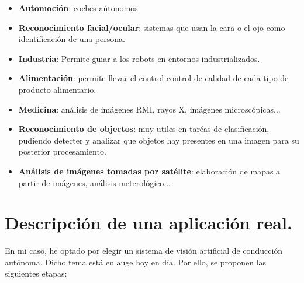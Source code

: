 \documentclass[12pt]{article}
\begin{document}
\begin{itemize}
	\item \textbf{Automoción}: coches aútonomos.
	\item \textbf{Reconocimiento facial/ocular}: sistemas que usan la cara o el ojo como identificación de una persona.
	\item \textbf{Industria}: Permite guiar a los robots en entornos industrializados.
	\item \textbf{Alimentación}: permite llevar el control control de calidad de cada tipo de producto alimentario.
	\item \textbf{Medicina}: análisis de imágenes RMI, rayos X, imágenes microscópicas...
	\item \textbf{Reconocimiento de objectos}: muy utiles en taréas de clasificación, pudiendo detecter y analizar que objetos hay presentes en una imagen para su posterior procesamiento.
	\item \textbf{Análisis de imágenes tomadas por satélite}: elaboración de mapas a partir de imágenes, análisis meterológico...
\end{itemize}

\section{Descripción de una aplicación real.}

En mi caso, he optado por elegir un sistema de visión artificial de conducción autónoma. Dicho tema está en auge hoy en día. Por ello, se proponen las siguientes etapas:
\end{document}
